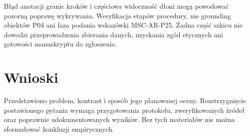 \documentclass[11pt,a4paper]{article}
\begin{document}
Błąd anotacji granic kroków i częściowa widoczność dłoni mogą powodować pozorną poprawę wykrywania. Weryfikacja etapów procedury, nie grounding obiektów P04 ani faza podania wskazówki MSC-AR-P25. Żadna część szkicu nie dowodzi przeprowadzenia zbierania danych, uzyskania zgód etycznych ani gotowości manuskryptu do zgłoszenia.

\section{Wnioski}

Przedstawiono problem, kontrast i sposób jego planowanej oceny. Rozstrzygnięcie postawionego pytania wymaga przygotowania protokołu, zweryfikowanych źródeł oraz poprawnie udokumentowanych wyników. Bez tych materiałów nie można sformułować konkluzji empirycznych.
\end{document}
